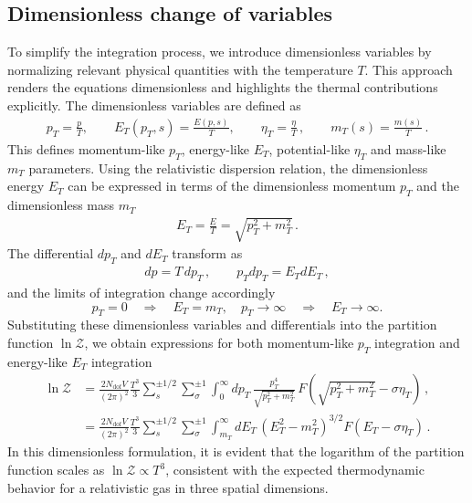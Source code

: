 \documentclass[epjST]{svjour}
\numberwithin{equation}{section}
\begin{document}
\subsection{Dimensionless change of variables}
\label{sec:dimensionless}
To simplify the integration process, we introduce dimensionless variables by normalizing relevant physical quantities with the temperature \( T \). This approach renders the equations dimensionless and highlights the thermal contributions explicitly. The dimensionless variables are defined as
\begin{align}
    \label{eq:dimensionless_variables}
    p_{T} = \frac{p}{T}, \qquad E_{T}(p_{T},s) = \frac{E(p,s)}{T}, \qquad \eta_{T} = \frac{\eta}{T}\,, \qquad m_{T}(s) = \frac{m(s)}{T}\,.
\end{align}
This defines momentum-like \(p_{T}\), energy-like \(E_{T}\), potential-like \(\eta_{T}\) and mass-like \(m_{T}\) parameters. Using the relativistic dispersion relation, the dimensionless energy \( E_{T} \) can be expressed in terms of the dimensionless momentum \( p_{T} \) and the dimensionless mass \( m_{T} \)
\begin{align}
E_{T} = \frac{E}{T} = \sqrt{p_{T}^{2} + m_{T}^{2}}\,.
\end{align}
The differential \( dp_{T} \) and \( dE_{T} \) transform as
\begin{align}
dp = T \, dp_{T}\,,\qquad p_{T}dp_{T} = E_{T} dE_{T}\,,
\end{align}
and the limits of integration change accordingly
\begin{equation}
p_{T} = 0 \quad \Rightarrow \quad E_{T} = m_{T}, \quad p_{T} \to \infty \quad \Rightarrow \quad E_{T} \to \infty.
\end{equation}
Substituting these dimensionless variables and differentials into the partition function \( \ln\mathcal{Z} \), we obtain expressions for both momentum-like \(p_{T}\) integration and energy-like \(E_{T}\) integration
\begin{align}
    \label{eq:dimensionless_partition}
    \ln\mathcal{Z} 
    &= \frac{2N_{\mathrm{dof}} V}{(2\pi)^{2}} \frac{T^{3}}{3} \sum_{s}^{\pm1/2}\sum_{\sigma}^{\pm1} \int_{0}^{\infty} dp_{T} \, \frac{p_{T}^{4}}{\sqrt{p_{T}^{2} + m_{T}^{2}}} \, F\left(\sqrt{p_{T}^{2} + m_{T}^{2}} - \sigma\eta_{T}\right)\,,\\
    \label{eq:dimensionless_partition2}
    &= \frac{2N_{\mathrm{dof}} V}{(2\pi)^{2}} \frac{T^{3}}{3} \sum_{s}^{\pm1/2}\sum_{\sigma}^{\pm1} \int_{m_{T}}^{\infty} dE_{T} \, (E_{T}^2-m_{T}^2)^{3/2} F\left(E_{T} - \sigma\eta_{T}\right)\,.
\end{align}
In this dimensionless formulation, it is evident that the logarithm of the partition function scales as \( \ln\mathcal{Z} \propto T^{3} \), consistent with the expected thermodynamic behavior for a relativistic gas in three spatial dimensions.
\end{document}

